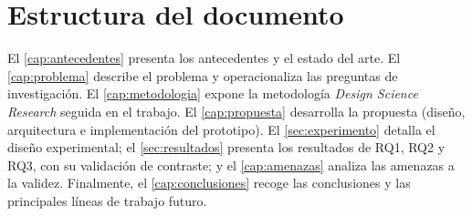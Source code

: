\section{Estructura del documento}
\label{sec:estructura}

El \autoref{cap:antecedentes} presenta los antecedentes y el estado del arte.
El \autoref{cap:problema} describe el problema y operacionaliza las
preguntas de investigación. El \autoref{cap:metodologia} expone la
metodología \emph{Design Science Research} seguida en el trabajo. El
\autoref{cap:propuesta} desarrolla la propuesta (diseño, arquitectura e
implementación del prototipo). El \autoref{sec:experimento} detalla el diseño
experimental; el \autoref{sec:resultados} presenta los resultados de RQ1, RQ2
y RQ3, con su validación de contraste; y el \autoref{cap:amenazas} analiza las
amenazas a la validez. Finalmente, el \autoref{cap:conclusiones} recoge las
conclusiones y las principales líneas de trabajo futuro.